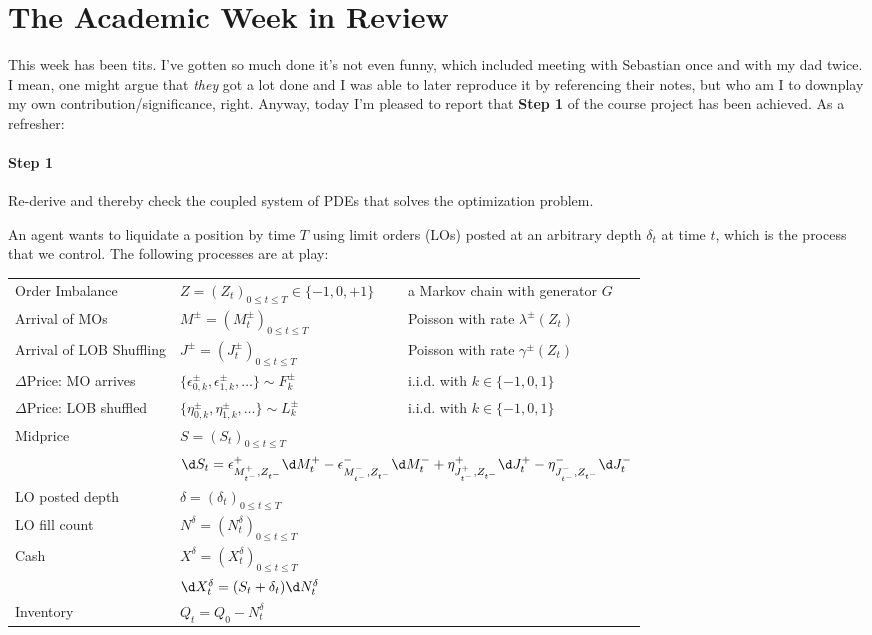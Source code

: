 \documentclass[12pt]{article}
\begin{document}
\section*{The Academic Week in Review}
This week has been tits. I've gotten so much done it's not even funny, which included meeting with Sebastian once and with my dad twice. I mean, one might argue that \textit{they} got a lot done and I was able to later reproduce it by referencing their notes, but who am I to downplay my own contribution/significance, right. Anyway, today I'm pleased to report that \textbf{Step 1} of the course project has been achieved. As a refresher:
\paragraph{Step 1} Re-derive and thereby check the coupled system of PDEs that solves the optimization problem.

An agent wants to liquidate a position by time $T$ using limit orders (LOs) posted at an arbitrary depth $\delta_t$ at time $t$, which is the process that we control. The following processes are at play:

\begin{tabular}{lll}
Order Imbalance & $Z = (Z_t)_{0 \leq t \leq T} \in \{ -1, 0, +1 \}$ & a Markov chain with generator $G$ \\
Arrival of MOs & $M^{\pm} = (M^{\pm}_t)_{0 \leq t \leq T}$ & Poisson with rate $\lambda^{\pm}(Z_t)$ \\
Arrival of LOB Shuffling & $J^{\pm} = (J^{\pm}_t)_{0 \leq t \leq T}$ & Poisson with rate $\gamma^{\pm}(Z_t)$ \\
$\Delta\text{Price:}$ MO arrives & $\{ \epsilon^\pm_{0,k}, \epsilon^\pm_{1,k}, \dots \} \sim F^\pm_k$ & i.i.d. with $k \in \{ -1,0,1 \}$ \\
$\Delta\text{Price:}$ LOB shuffled & $\{ \eta^\pm_{0,k}, \eta^\pm_{1,k}, \dots \} \sim L^\pm_k$ & i.i.d. with $k \in \{ -1,0,1 \}$ \\
\multirow{2}{*}{Midprice} & $S = (S_t)_{0 \leq t \leq T}$ & \\
& \multicolumn{2}{l}{$\d S_t = \epsilon^+_{M^+_{t^-},Z_{t^-}} \d M^+_t - \epsilon^-_{M^-_{t^-},Z_{t^-}} \d M^-_t + \eta^+_{J^+_{t^-},Z_{t^-}} \d J^+_t - \eta^-_{J^-_{t^-},Z_{t^-}} \d J^-_t$}\\
LO posted depth & $\delta = (\delta_t)_{0 \leq t \leq T}$ &  \\
LO fill count & $N^{\delta} = (N^{\delta}_t)_{0 \leq t \leq T}$ &  \\
\multirow{2}{*}{Cash} & $X^{\delta} = (X^{\delta}_t)_{0 \leq t \leq T}$ & \\
& \multicolumn{2}{l}{$\d X^{\delta}_t = (S_t + \delta_t) \d N^{\delta}_t$} \\
Inventory & $Q_t = Q_0 - N_t^\delta$ & \\
\end{tabular}
\end{document}
